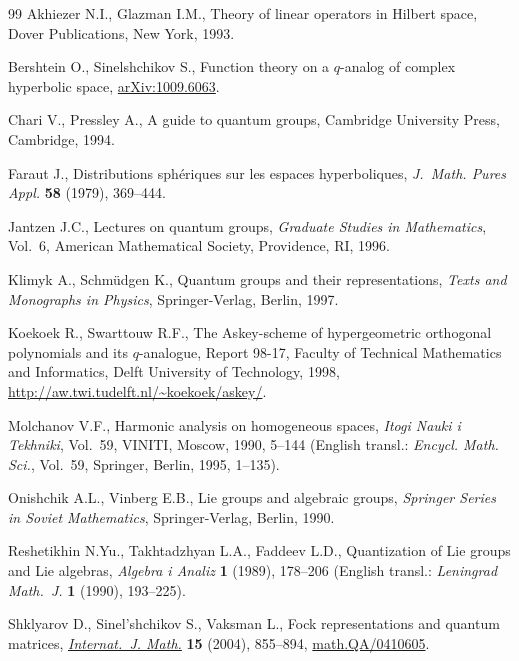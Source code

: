 \documentclass[11pt]{article}
\begin{document}
\begin{thebibliography}{99}
Akhiezer N.I., Glazman I.M.,
Theory of linear operators in Hilbert space,  Dover Publications, New York, 1993.

Bershtein O., Sinelshchikov S.,
Function theory on a $q$-analog of complex hyperbolic space,
\href{http://arxiv.org/abs/1009.6063}{arXiv:1009.6063}.

Chari V., Pressley A.,
A guide to quantum groups,
Cambridge University Press, Cambridge, 1994.


Faraut J.,
Distributions sph\'eriques sur les espaces hyperboliques,
{\it J.~Math. Pures Appl.} {\bf 58} (1979), 369--444.

Jantzen J.C.,
Lectures on quantum groups,
{\it Graduate Studies in Mathematics}, Vol.~6, American Mathema\-ti\-cal Society, Providence, RI, 1996.

Klimyk A., Schm\"udgen K.,
Quantum groups and their representations,
{\it Texts and Monographs in Physics}, Springer-Verlag, Berlin, 1997.

Koekoek R., Swarttouw R.F.,
The Askey-scheme of hypergeometric orthogonal polynomials and its $q$-analogue, Report 98-17,
Faculty of Technical Mathematics and Informatics, Delft University of Technology, 1998, \url{http://aw.twi.tudelft.nl/~koekoek/askey/}.

Molchanov V.F.,
Harmonic analysis on homogeneous spaces,
{\it Itogi Nauki i Tekhniki}, Vol.~59, VINITI, Moscow, 1990, 5--144
(English transl.:  {\it Encycl. Math. Sci.}, Vol.~59, Springer, Berlin, 1995, 1--135).

Onishchik A.L., Vinberg E.B.,
Lie groups and algebraic groups,
{\it Springer Series in Soviet Mathematics}, Springer-Verlag, Berlin, 1990.

Reshetikhin N.Yu., Takhtadzhyan L.A., Faddeev L.D.,
Quantization of Lie groups and Lie algebras,
{\it Algebra i Analiz} {\bf  1} (1989), 178--206 (English transl.: {\it Leningrad Math.~J.} {\bf 1} (1990), 193--225).

Shklyarov D., Sinel'shchikov S., Vaksman L.,
Fock representations and quantum matrices,
\href{http://dx.doi.org/10.1142/S0129167X04002600}{{\it Internat.~J. Math.}} {\bf 15} (2004), 855--894,
\href{http://arxiv.org/abs/math.QA/0410605}{math.QA/0410605}.

\end{thebibliography}
\end{document}
